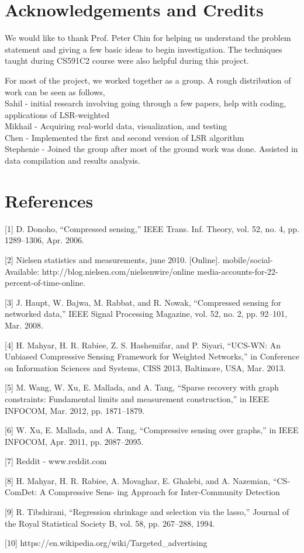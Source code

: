 \documentclass{article}
\begin{document}
\section{Acknowledgements and Credits}
We would like to thank Prof. Peter Chin for helping us understand the problem statement and giving a few basic ideas to
begin investigation. The techniques taught during CS591C2 course were also helpful during this project. 

For most of the project, we worked together as a group. A rough distribution of work can be seen as follows, \\
Sahil - initial research involving going through a few papers, help with coding, applications of LSR-weighted \\
Mikhail - Acquiring real-world data, visualization, and testing\\
Chen - Implemented the first and second version of LSR algorithm \\
Stephenie - Joined the group after most of the ground work was done. Assisted in data compilation and results analysis.

\section*{References}
\small

[1] D. Donoho, “Compressed sensing,” IEEE Trans. Inf. Theory, vol. 52,
no. 4, pp. 1289–1306, Apr. 2006.

[2] Nielsen statistics and measurements, june 2010. [Online].
mobile/social-
Available: http://blog.nielsen.com/nielsenwire/online
media-accounts-for-22-percent-of-time-online.

[3] J. Haupt, W. Bajwa, M. Rabbat, and R. Nowak, “Compressed sensing
for networked data,” IEEE Signal Processing Magazine, vol. 52, no. 2,
    pp. 92–101, Mar. 2008.

[4] H. Mahyar, H. R. Rabiee, Z. S. Hashemifar, and P. Siyari, “UCS-WN: An
Unbiased Compressive Sensing Framework for Weighted Networks,” in
Conference on Information Sciences and Systems, CISS 2013, Baltimore,
USA, Mar. 2013.

[5] M. Wang, W. Xu, E. Mallada, and A. Tang, “Sparse recovery with graph
constraints: Fundamental limits and measurement construction,” in IEEE
INFOCOM, Mar. 2012, pp. 1871–1879.

[6] W. Xu, E. Mallada, and A. Tang, “Compressive sensing over graphs,”
in IEEE INFOCOM, Apr. 2011, pp. 2087–2095.

[7] Reddit - www.reddit.com

[8] H. Mahyar, H. R. Rabiee, A. Movaghar, E. Ghalebi,
and A. Nazemian, “CS-ComDet: A Compressive Sens-
ing Approach for Inter-Community Detection

[9] R. Tibshirani, “Regression shrinkage and selection via
the lasso,” Journal of the Royal Statistical Society B,
vol. 58, pp. 267–288, 1994.

[10] https://en.wikipedia.org/wiki/Targeted\_advertising
\end{document}
